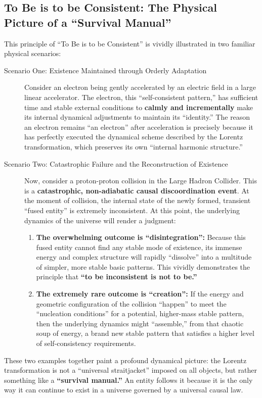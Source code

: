 \documentclass[11pt, a4paper]{article}
\begin{document}
\subsection{To Be is to be Consistent: The Physical Picture of a ``Survival Manual''}
This principle of ``To Be is to be Consistent'' is vividly illustrated in two familiar physical scenarios:
\begin{description}
\item[Scenario One: Existence Maintained through Orderly Adaptation]
Consider an electron being gently accelerated by an electric field in a large linear accelerator. The electron, this ``self-consistent pattern,'' has sufficient time and stable external conditions to \textbf{calmly and incrementally} make its internal dynamical adjustments to maintain its ``identity.'' The reason an electron remains ``an electron'' after acceleration is precisely because it has perfectly executed the dynamical scheme described by the Lorentz transformation, which preserves its own ``internal harmonic structure.''
\item[Scenario Two: Catastrophic Failure and the Reconstruction of Existence]
Now, consider a proton-proton collision in the Large Hadron Collider. This is a \textbf{catastrophic, non-adiabatic causal discoordination event}. At the moment of collision, the internal state of the newly formed, transient ``fused entity'' is extremely inconsistent. At this point, the underlying dynamics of the universe will render a judgment:
\begin{enumerate}
\item \textbf{The overwhelming outcome is ``disintegration'':} Because this fused entity cannot find any stable mode of existence, its immense energy and complex structure will rapidly ``dissolve'' into a multitude of simpler, more stable basic patterns. This vividly demonstrates the principle that \textbf{``to be inconsistent is not to be.''}
\item \textbf{The extremely rare outcome is ``creation'':} If the energy and geometric configuration of the collision ``happen'' to meet the ``nucleation conditions'' for a potential, higher-mass stable pattern, then the underlying dynamics might ``assemble,'' from that chaotic soup of energy, a brand new stable pattern that satisfies a higher level of self-consistency requirements.
\end{enumerate}
\end{description}
These two examples together paint a profound dynamical picture: the Lorentz transformation is not a ``universal straitjacket'' imposed on all objects, but rather something like a \textbf{``survival manual.''} An entity follows it because it is the only way it can continue to exist in a universe governed by a universal causal law.
\end{document}
